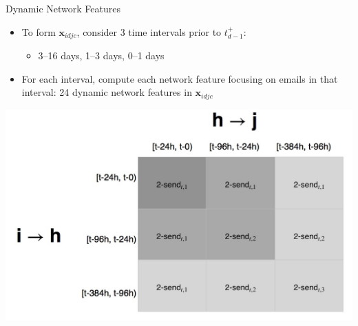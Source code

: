 \documentclass[10pt, xcolor=table]{beamer}
\theoremstyle{definition}
\theoremstyle{remark}
\begin{document}
\begin{frame}{Dynamic Network Features}


\begin{itemize}
\item To form $\boldsymbol{x}_{idjc}$, consider 3 time intervals prior
  to $t^{+}_{d-1}$:\vspace{0.1cm}
  \begin{itemize}
    \item 3--16 days, 1--3 days, 0--1 days
  \end{itemize}
  \vspace{0.2cm}

\item For each interval, compute each network feature focusing on
  emails in that interval: 24 dynamic network features in
  $\boldsymbol{x}_{idjc}$

\end{itemize}
  \vspace{0.2cm}
\centering
\includegraphics[scale=.15]{./figures/triadtable}

\end{frame}
\end{document}
